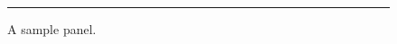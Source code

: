 \begin{figure}[tb]%
\begin{minipage}[t]{.45\linewidth}
\rule{1cm}{1cm}

\small A sample panel.
\end{minipage}%
\end{figure}%
